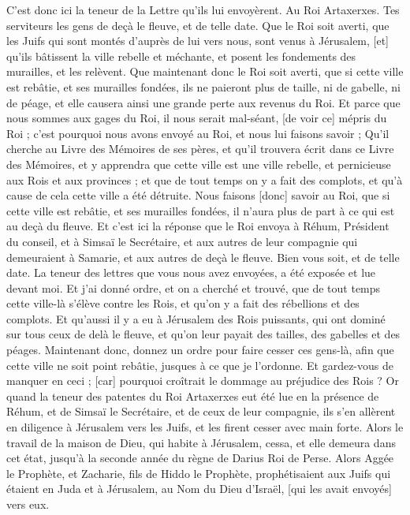 \begin{multicols}{2}
C'est donc ici la teneur de la Lettre qu'ils lui envoyèrent. Au Roi Artaxerxes. Tes serviteurs les gens de deçà le fleuve, et de telle date.
Que le Roi soit averti, que les Juifs qui sont montés d'auprès de lui vers nous, sont venus à Jérusalem, [et] qu'ils bâtissent la ville rebelle et méchante, et posent les fondements des murailles, et les relèvent.
Que maintenant donc le Roi soit averti, que si cette ville est rebâtie, et ses murailles fondées, ils ne paieront plus de taille, ni de gabelle, ni de péage, et elle causera ainsi une grande perte aux revenus du Roi.
Et parce que nous sommes aux gages du Roi, il nous serait mal-séant, [de voir ce] mépris du Roi ; c'est pourquoi nous avons envoyé au Roi, et nous lui faisons savoir ;
Qu'il cherche au Livre des Mémoires de ses pères, et qu'il trouvera écrit dans ce Livre des Mémoires, et y apprendra que cette ville est une ville rebelle, et pernicieuse aux Rois et aux provinces ; et que de tout temps on y a fait des complots, et qu'à cause de cela cette ville a été détruite.
Nous faisons [donc] savoir au Roi, que si cette ville est rebâtie, et ses murailles fondées, il n'aura plus de part à ce qui est au deçà du fleuve.
Et c'est ici la réponse que le Roi envoya à Réhum, Président du conseil, et à Simsaï le Secrétaire, et aux autres de leur compagnie qui demeuraient à Samarie, et aux autres de deçà le fleuve. Bien vous soit, et de telle date.
La teneur des lettres que vous nous avez envoyées, a été exposée et lue devant moi.
Et j'ai donné ordre, et on a cherché et trouvé, que de tout temps cette ville-là s'élève contre les Rois, et qu'on y a fait des rébellions et des complots.
Et qu'aussi il y a eu à Jérusalem des Rois puissants, qui ont dominé sur tous ceux de delà le fleuve, et qu'on leur payait des tailles, des gabelles et des péages.
Maintenant donc, donnez un ordre pour faire cesser ces gens-là, afin que cette ville ne soit point rebâtie, jusques à ce que je l'ordonne.
Et gardez-vous de manquer en ceci ; [car] pourquoi croîtrait le dommage au préjudice des Rois ?
Or quand la teneur des patentes du Roi Artaxerxes eut été lue en la présence de Réhum, et de Simsaï le Secrétaire, et de ceux de leur compagnie, ils s'en allèrent en diligence à Jérusalem vers les Juifs, et les firent cesser avec main forte.
Alors le travail de la maison de Dieu, qui habite à Jérusalem, cessa, et elle demeura dans cet état, jusqu'à la seconde année du règne de Darius Roi de Perse.
\VerseOne{}Alors Aggée le Prophète, et Zacharie, fils de Hiddo le Prophète, prophétisaient aux Juifs qui étaient en Juda et à Jérusalem, au Nom du Dieu d'Israël, [qui les avait envoyés] vers eux.

\end{multicols}
